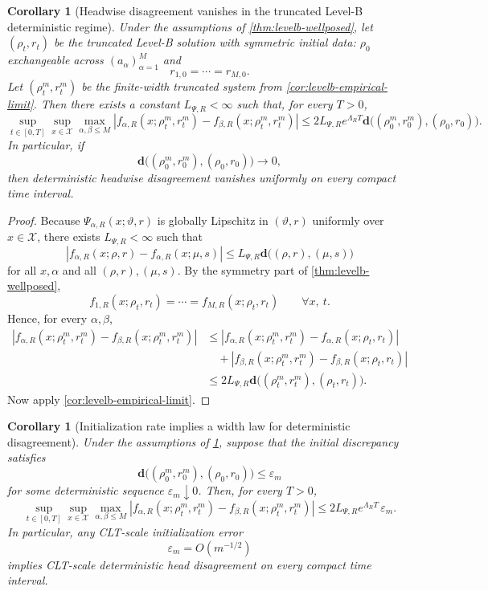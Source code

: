 \documentclass[11pt]{article}
\newtheorem{corollary}[theorem]{Corollary}
\theoremstyle{definition}
\begin{document}
\begin{corollary}[Headwise disagreement vanishes in the truncated Level-B deterministic regime]
\label{cor:levelb-disagreement}
Under the assumptions of \cref{thm:levelb-wellposed}, let $(\rho_t,r_t)$ be the truncated Level-B solution with symmetric initial data:
$\rho_0$ exchangeable across $(a_\alpha)_{\alpha=1}^M$ and
\[
  r_{1,0}=\cdots=r_{M,0}.
\]
Let $(\rho_t^m,r_t^m)$ be the finite-width truncated system from \cref{cor:levelb-empirical-limit}.
Then there exists a constant $L_{\Psi,R}<\infty$ such that, for every $T>0$,
\begin{equation}
  \sup_{t\in[0,T]}
  \sup_{x\in\mathcal X}
  \max_{\alpha,\beta\le M}
  |f_{\alpha,R}(x;\rho_t^m,r_t^m)-f_{\beta,R}(x;\rho_t^m,r_t^m)|
  \le
  2L_{\Psi,R}e^{\Lambda_R T}
  \mathbf d\bigl((\rho_0^m,r_0^m),(\rho_0,r_0)\bigr).
  \label{eq:levelb-disagreement}
\end{equation}
In particular, if
\[
  \mathbf d\bigl((\rho_0^m,r_0^m),(\rho_0,r_0)\bigr)\to 0,
\]
then deterministic headwise disagreement vanishes uniformly on every compact time interval.
\end{corollary}

\begin{proof}
Because $\Psi_{\alpha,R}(x;\vartheta,r)$ is globally Lipschitz in $(\vartheta,r)$ uniformly over $x\in\mathcal X$,
there exists $L_{\Psi,R}<\infty$ such that
\[
  |f_{\alpha,R}(x;\rho,r)-f_{\alpha,R}(x;\mu,s)|
  \le
  L_{\Psi,R}\mathbf d\bigl((\rho,r),(\mu,s)\bigr)
\]
for all $x,\alpha$ and all $(\rho,r),(\mu,s)$.
By the symmetry part of \cref{thm:levelb-wellposed},
\[
  f_{1,R}(x;\rho_t,r_t)=\cdots=f_{M,R}(x;\rho_t,r_t)
  \qquad \forall x,\ t.
\]
Hence, for every $\alpha,\beta$,
\begin{align*}
  |f_{\alpha,R}(x;\rho_t^m,r_t^m)-f_{\beta,R}(x;\rho_t^m,r_t^m)|
  &\le
  |f_{\alpha,R}(x;\rho_t^m,r_t^m)-f_{\alpha,R}(x;\rho_t,r_t)|
  \\
  &\quad+
  |f_{\beta,R}(x;\rho_t^m,r_t^m)-f_{\beta,R}(x;\rho_t,r_t)|
  \\
  &\le
  2L_{\Psi,R}\mathbf d\bigl((\rho_t^m,r_t^m),(\rho_t,r_t)\bigr).
\end{align*}
Now apply \cref{cor:levelb-empirical-limit}.
\end{proof}

\begin{corollary}[Initialization rate implies a width law for deterministic disagreement]
\label{cor:levelb-width-law}
Under the assumptions of \cref{cor:levelb-disagreement}, suppose that the initial discrepancy satisfies
\[
  \mathbf d\bigl((\rho_0^m,r_0^m),(\rho_0,r_0)\bigr)\le \varepsilon_m
\]
for some deterministic sequence $\varepsilon_m\downarrow 0$.
Then, for every $T>0$,
\begin{equation}
  \sup_{t\in[0,T]}
  \sup_{x\in\mathcal X}
  \max_{\alpha,\beta\le M}
  |f_{\alpha,R}(x;\rho_t^m,r_t^m)-f_{\beta,R}(x;\rho_t^m,r_t^m)|
  \le
  2L_{\Psi,R}e^{\Lambda_R T}\,\varepsilon_m.
  \label{eq:levelb-width-law}
\end{equation}
In particular, any CLT-scale initialization error
\[
  \varepsilon_m=O(m^{-1/2})
\]
implies CLT-scale deterministic head disagreement on every compact time interval.
\end{corollary}
\end{document}
